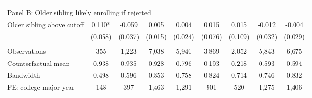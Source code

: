 {{\begin{tabular}{lcccccccc}
&  &  &  & & & & & &    \\
\multicolumn{9}{l}{Panel B: Older sibling likely enrolling if rejected} \\
Older sibling above cutoff&       0.110*  &      -0.059   &       0.005   &       0.004   &       0.015   &       0.015   &      -0.012   &      -0.004   \\
                    &     (0.058)   &     (0.037)   &     (0.015)   &     (0.024)   &     (0.076)   &     (0.109)   &     (0.032)   &     (0.029)   \\
                    &               &               &               &               &               &               &               &               \\
Observations        &         355   &       1,223   &       7,038   &       5,940   &       3,869   &       2,052   &       5,843   &       6,675   \\
Counterfactual mean &       0.938   &       0.935   &       0.928   &       0.796   &       0.193   &       0.218   &       0.593   &       0.594   \\
Bandwidth           &       0.498   &       0.596   &       0.853   &       0.758   &       0.824   &       0.714   &       0.746   &       0.832   \\
FE: college-major-year&         148   &         397   &       1,463   &       1,291   &         901   &         520   &       1,275   &       1,406   \\
 

\bottomrule
\end{tabular}
}
}
